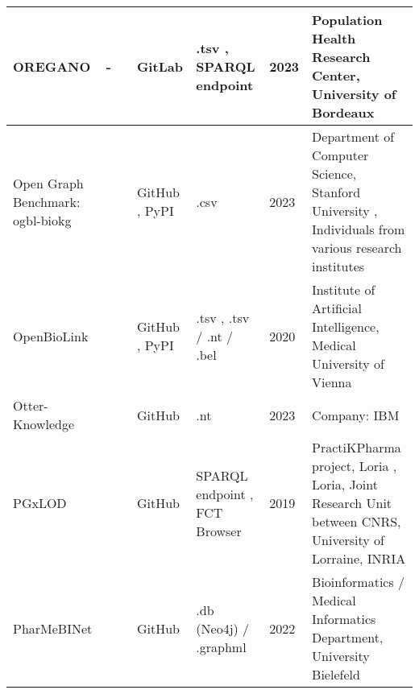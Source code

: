 \documentclass{article}
\begin{document}
\begin{landscape}
\begin{xltabular}{\textwidth}{p{3cm}|p{2.2cm}|p{2.2cm}|p{2.2cm}|p{2.2cm}|p{1cm}|p{6cm}}
\hline


OREGANO
&
-
&
\cite{oregano_publication1}
\cite{oregano_publication2}
&
GitLab
\cite{oregano_gitlab}
&
.tsv
\cite{oregano_data1}
\cite{oregano_data2}
\cite{oregano_data3},
SPARQL endpoint
\cite{oregano_data4}
&
2023
&
Population Health Research Center, University of Bordeaux
\cite{oregano_group}
\\


\hline


Open Graph Benchmark: ogbl-biokg
&
\cite{ogblbiokg_website}
&
\cite{ogblbiokg_publication}
&
GitHub
\cite{ogblbiokg_github},
PyPI
\cite{ogblbiokg_pypi}
&
.csv
\cite{ogblbiokg_data}
&
2023
&
Department of Computer Science, Stanford University
\cite{ogblbiokg_group},
Individuals from various research institutes
\\


\hline


OpenBioLink
&
\cite{openbiolink_website}
&
\cite{openbiolink_publication}
&
GitHub
\cite{openbiolink_github},
PyPI
\cite{openbiolink_pypi}
&
.tsv
\cite{openbiolink_data1},
.tsv / .nt / .bel
\cite{openbiolink_data2}
&
2020
&
Institute of Artificial Intelligence, Medical University of Vienna
\cite{openbiolink_group}
\\


\hline


Otter-Knowledge
&
\cite{otter_website}
&
\cite{otter_publication}
&
GitHub
\cite{otter_github}
&
.nt
\cite{otter_data1}
\cite{otter_data2}
\cite{otter_data3}
\cite{otter_data4}
&
2023
&
Company: IBM
\cite{otter_group}
\\


\hline


PGxLOD
&
\cite{pgxlod_website}
&
\cite{pgxlod_publication1}
\cite{pgxlod_publication2}
&
GitHub
\cite{pgxlod_github1}
\cite{pgxlod_github2}
&
SPARQL endpoint
\cite{pgxlod_data1},
FCT Browser
\cite{pgxlod_data2}
&
2019
&
PractiKPharma project, Loria
\cite{pgxlod_group1},
Loria, Joint Research Unit between CNRS, University of Lorraine, INRIA
\cite{pgxlod_group2}
\\


\hline


PharMeBINet
&
\cite{pharmebinet_website}
&
\cite{pharmebinet_publication}
&
GitHub
\cite{pharmebinet_github}
&
.db (Neo4j) / .graphml
\cite{pharmebinet_data1}
\cite{pharmebinet_data2}
&
2022
&
Bioinformatics / Medical Informatics Department, University Bielefeld
\cite{pharmebinet_group}
\\


\hline



\end{xltabular}
\end{landscape}
\end{document}
